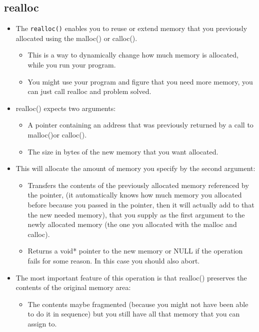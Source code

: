 \subsection{realloc}
\begin{itemize}
    \item The \texttt{realloc()} enables you to reuse or extend memory that you previously allocated using the malloc() or calloc(). 
        \begin{itemize}
            \item This is a way to dynamically change how much memory is allocated, while you run your program.
            \item You might use your program and figure that you need more memory, you can just call realloc and problem solved.  
        \end{itemize}
    
    \item realloc() expects two arguments:
        \begin{itemize}
            \item A pointer containing an address that was previously returned by a call to malloc()or calloc().
            \item The size in bytes of the new memory that you want allocated. 
        \end{itemize}
    
    \item This will allocate the amount of memory you specify by the second argument:
        \begin{itemize}
            \item Transfers the contents of the previously allocated memory referenced by the pointer, (it automatically knows how much memory you allocated before because you passed in the pointer, then it will actually add to that the new needed memory), that you supply as the first argument to the newly allocated memory (the one you allocated with the malloc and calloc). 
            \item Returns a void* pointer to the new memory or NULL if the operation fails for some reason. In this case you should also abort.
        \end{itemize}
    
    \item The most important feature of this operation is that realloc() preserves the contents of the original memory area: 
        \begin{itemize}
            \item The contents maybe fragmented (because you might not have been able to do it in sequence) but you still have all that memory that you can assign to. 
        \end{itemize}
\end{itemize}

